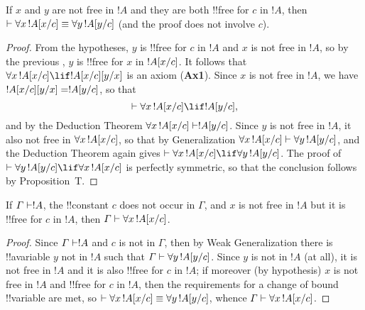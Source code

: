 \documentclass[../../include/open-logic-section]{subfiles}
\begin{document}
\begin{lem}
If $x$ and $y$ are not free in $!A$ and they are both !!{free for} $c$
in $!A$, then $\Proves \lforall[x][\Subst{!A}{x}{c}] \equiv
\lforall[y][\Subst{!A}{y}{c}]$ (and the proof does not involve $c$).
\end{lem}

\begin{proof} 
From the hypotheses, $y$ is !!{free for} $c$ in $!A$ and $x$ is not
free in $!A$, so by the previous , $y$ is
!!{free for} $x$ in $!A[x/c]$. It follows that
$\lforall[x][\Subst{!A}{x}{c} \lif \Subst{!A}{x}{c} \Subst{}{y}{x}]$
is an axiom (\textbf{Ax1}). Since $x$ is not free in $!A$, we have
$!A[x/c] [y/x] = !A[y/c]$, so that 
\[
\Proves \lforall[x][\Subst{!A}{x}{c}] \lif \Subst{!A}{y}{c}, 
\] 
and by the Deduction Theorem $\lforall[x][\Subst{!A}{x}{c}] \Proves
\Subst{!A}{y}{c}$. Since $y$ is not free in $!A$, it also not free in
$\lforall[x][\Subst{!A}{x}{c}]$, so that by Generalization
$\lforall[x][\Subst{!A}{x}{c}] \Proves \lforall[y][\Subst{!A}{y}{c}]$,
and the Deduction Theorem again gives $\Proves
\lforall[x][\Subst{!A}{x}{c}] \lif \lforall[y][\Subst{!A}{y}{c}]$.
The proof of $\Proves \lforall[y][\Subst{!A}{y}{c}] \lif \lforall[x]
[\Subst{!A}{x}{c}]$ is perfectly symmetric, so that the conclusion
follows by Proposition~T.
\end{proof}

\begin{thm}
If $\Gamma \Proves !A$, the !!{constant} $c$ does not occur in
$\Gamma$, and $x$ is not free in $!A$ but it is !!{free for} $c$ in $!A$,
then $\Gamma \Proves \lforall[x][\Subst{!A}{x}{c}]$. 
\end{thm}

\begin{proof} 
Since $\Gamma \Proves !A$ and $c$ is not in $\Gamma$, then by
Weak Generalization there is !!a{variable} $y$ not in $!A$ such that
$\Gamma \Proves \lforall[y][\Subst{!A}{y}{c}]$. Since $y$ is not in $!A$
(at all), it is not free in $!A$ and it is also !!{free for} $c$ in $!A$;
if moreover (by hypothesis) $x$ is not free in $!A$ and !!{free for} $c$ in
$!A$, then the requirements for a change of bound !!{variable} are met, so
$\Proves \lforall[x][\Subst{!A}{x}{c}] \equiv
\lforall[y][\Subst{!A}{y}{c}]$, whence $\Gamma \Proves
\lforall[x][\Subst{!A}{x}{c}]$. 
\end{proof}
\end{document}
